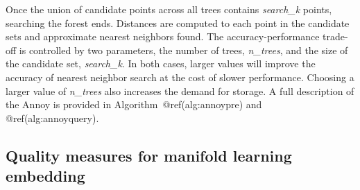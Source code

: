 \documentclass{article}
\begin{document}
Once the union of candidate points across all trees contains
\textit{search\_k} points, searching the forest ends. Distances are
computed to each point in the candidate sets and approximate nearest
neighbors found. The accuracy-performance trade-off is controlled by two
parameters, the number of trees, \textit{n\_trees}, and the size of the
candidate set, \textit{search\_k}. In both cases, larger values will
improve the accuracy of nearest neighbor search at the cost of slower
performance. Choosing a larger value of \textit{n\_trees} also increases
the demand for storage. A full description of the Annoy is provided in
Algorithm~@ref(alg:annoypre) and @ref(alg:annoyquery).

\hypertarget{quality-measures-for-manifold-learning-embedding}{%
\subsection{Quality measures for manifold learning
embedding}\label{quality-measures-for-manifold-learning-embedding}}
\end{document}
